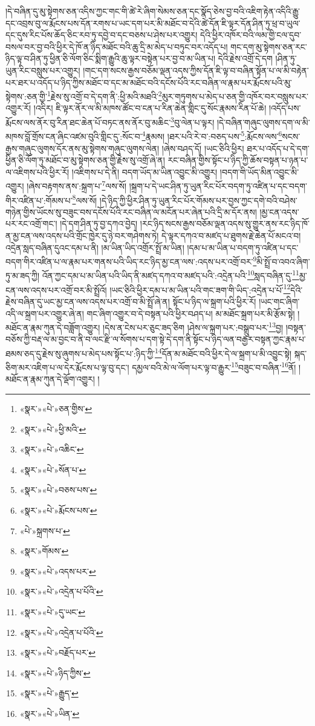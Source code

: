 །དེ་བཞིན་དུ་མུ་སྟེགས་ཅན་འདིས་ཀྱང་གང་གི་ཚེ་རེ་ཞིག་སེམས་ཅན་དང་སྣོད་ཅེས་བྱ་བའི་འཇིག་རྟེན་འདིའི་རྒྱུ་དང་འབྲས་བུ་ལ་རྨོངས་པས་དོན་རགས་པ་ཡང་དག་པར་མི་མཐོང་བ་དེའི་ཚེ་དོན་ཇི་ལྟར་དོན་ཤིན་ཏུ་ཕྲ་བ་ཡུལ་དང་དུས་རིང་པོས་ཆོད་ཅིང་རབ་ཏུ་དབྱེ་བ་དང་བཅས་པ་ཤེས་པར་འགྱུར། དེའི་ཕྱིར་འཁོར་བའི་ལམ་གྱི་ངལ་དུབ་བསལ་བར་བྱ་བའི་ཕྱིར་དེ་ཁོ་ན་ཉིད་མཐོང་བའི་ཆུ་དྲི་མ་མེད་པ་བཏུང་བར་འདོད་པ། གང་དག་མུ་སྟེགས་ཅན་རང་ཉིད་ལྟ་བ་ཤིན་ཏུ་ཕྱིན་ཅི་ལོག་ཅིང་སྨིག་རྒྱུའི་ཆུ་ལྟར་བསྟེན་པར་བྱ་བ་མ་ཡིན་པ། དེའི་རྗེས་འགྲོ་དེ་དག །ཤིན་ཏུ་ཡུན་རིང་བསླུས་པར་འགྱུར། །གང་དག་སངས་རྒྱས་བཅོམ་ལྡན་འདས་ཀྱིས་དོན་ཇི་ལྟ་བ་བཞིན་སྟོན་པ་ལ་མི་བརྟེན་པར་ཐར་པ་འདོད་པ་ཉིད་ཀྱིས་མཐོང་བ་དང་མ་མཐོང་བའི་དངོས་པོའི་རང་བཞིན་ལ་རྣམ་པར་རྨོངས་པའི་མུ་སྟེགས་:ཅན་གྱི་\footnote{«སྣར་»«པེ་»ཅན་གྱིས་}རྗེས་སུ་འགྲོ་བ་དེ་དག་ནི་:ཕྱི་མའི་མཐའི་\footnote{«སྣར་»«པེ་»ཕྱི་མའི་}མུར་གཏུགས་པ་མེད་པ་ཅན་གྱི་འཁོར་བར་བསླུས་པར་འགྱུར་རོ། །འདིར། ཇི་ལྟར་ནོར་ལ་མི་མཁས་ཚོང་བ་ངན་པ་རིན་ཆེན་གླིང་དུ་སོང་རྣམས་རིན་པོ་ཆེ། །འདོད་པས་རྨོངས་ལས་ནོར་བུ་རིན་ཐང་ཆེན་པོ་བཏང་ནས་ནོར་བུ་མཆིང་\footnote{«སྣར་»«པེ་»འཆིང་}བུ་ལེན་པ་ལྟར། །དེ་བཞིན་གཞུང་ལུགས་དག་ལ་མི་མཁས་བློ་གྲོས་ངན་ཞིང་འཛམ་བུའི་གླིང་དུ་:སོང་བ་\footnote{«སྣར་»«པེ་»སོན་པ་}རྣམས། །ཐར་པའི་རེ་བ་:བཅད་པས་\footnote{«སྣར་»«པེ་»བཅས་པས་}:རྨོངས་ལས་\footnote{«སྣར་»«པེ་»རྨོངས་པས་}སངས་རྒྱས་གཞུང་ལུགས་དོར་ནས་མུ་སྟེགས་གཞུང་ལུགས་ལེན། །ཞེས་བཤད་དོ། །ཡང་ཅིའི་ཕྱིར། ཐར་པ་འདོད་པ་དེ་དག་ཕྱིན་ཅི་ལོག་ཏུ་མཐོང་བ་མུ་སྟེགས་ཅན་གྱི་རྗེས་སུ་འགྲོ་ཞེ་ན། རང་བཞིན་གྱིས་སྟོང་པ་ཉིད་ཀྱི་ཆོས་བསྟན་པ་ཉན་པ་ལ་འཇིགས་པའི་ཕྱིར་རོ། །འཇིགས་པ་དེ་ནི། བདག་ཡོད་མ་ཡིན་འབྱུང་མི་འགྱུར། །བདག་གི་ཡོད་མིན་འབྱུང་མི་འགྱུར། །ཞེས་བརྟགས་ནས་:སྐྲག་པ་\footnote{«པེ་»སྐྲགས་པ་}ལས་སོ། །སྐྲག་པ་དེ་ཡང་ཤིན་ཏུ་ཡུན་རིང་པོར་བདག་ཏུ་འཛིན་པ་དང་བདག་གིར་འཛིན་པ་:གོམས་པ་\footnote{«སྣར་»གོམས་}ལས་སོ། །དེ་ཉིད་ཀྱི་ཕྱིར་ཤིན་ཏུ་ཡུན་རིང་པོར་གོམས་པར་བྱས་ཀྱང་དགེ་བའི་བཤེས་གཉེན་གྱིས་ཡོངས་སུ་བཟུང་བས་དངོས་པོའི་རང་བཞིན་ལ་མངོན་པར་ཞེན་པའི་དྲི་མ་དོར་ནས། །མྱ་ངན་འདས་པར་རང་འགྲོ་གང་། །དེ་དག་ཤིན་ཏུ་བྱ་དཀའ་བྱེད། །རང་ཉིད་སངས་རྒྱས་བཅོམ་ལྡན་འདས་སུ་གྱུར་ནས་རང་ཉིད་ཁོ་ན་མྱ་ངན་ལས་འདས་པའི་གྲོང་ཁྱེར་དུ་ཉེ་བར་གཤེགས་ཏེ། དེ་ལྟར་དཀའ་བ་མཛད་པ་ཐུགས་རྗེ་ཆེན་པོ་མངའ་བ། འདྲེན་སླད་བཞིན་དུའང་དམ་པ་ནི། །མ་ཡིན་ཡིད་འགྲོར་སྤྲོ་མ་ཡིན། །དམ་པ་མ་ཡིན་པ་བདག་ཏུ་འཛིན་པ་དང་བདག་གིར་འཛིན་པ་ལ་རྣམ་པར་གནས་པའི་ཡིད་རང་ཉིད་མྱ་ངན་ལས་:འདས་པར་འགྲོ་བར་\footnote{«སྣར་»«པེ་»འདས་པར་}མི་སྤྲོ་བ་འབའ་ཞིག་ཏུ་མ་ཟད་ཀྱི། འོན་ཀྱང་དམ་པ་མ་ཡིན་པའི་ཡིད་ནི་མཛད་དཀའ་བ་མཛད་པའི་:འདྲེན་པའི་\footnote{«སྣར་»«པེ་»འདྲེན་པ་པོའི་}སླད་བཞིན་དུ་\footnote{«སྣར་»«པེ་»དུ་ཡང་}མྱ་ངན་ལས་འདས་པར་འགྲོ་བར་མི་སྤྲོའོ། །ཡང་ཅིའི་ཕྱིར་དམ་པ་མ་ཡིན་པའི་གང་ཟག་གི་ཡིད་:འདྲེན་པ་པོ་\footnote{«སྣར་»«པེ་»འདྲེན་པ་པོའི་}དེའི་རྗེས་བཞིན་དུ་ཡང་མྱ་ངན་ལས་འདས་པར་འགྲོ་བ་མི་སྤྲོ་ཞེ་ན། སྟོང་པ་ཉིད་ལ་སྐྲག་པའི་ཕྱིར་རོ། །ཡང་གང་ཞིག་འདི་ལ་སྐྲག་པར་འགྱུར་ཞེ་ན། གང་ཞིག་འགྱུར་བ་དེ་བསྟན་པའི་ཕྱིར་བཤད་པ། མ་མཐོང་སྐྲག་པར་མི་རྩོམ་སྟེ། །མཐོང་ན་རྣམ་ཀུན་དེ་བཟློག་འགྱུར། །དེས་ན་ངེས་པར་ཅུང་ཟད་ཅིག །ཤེས་ལ་སྐྲག་པར་:བསྒྲུབ་པར་\footnote{«སྣར་»«པེ་»བརྗོད་པར་}བྱ། །བསྟན་བཅོས་ཀྱི་བརྡ་ལ་མ་བྱང་བ་ནི་བ་ལང་རྫི་ལ་སོགས་པ་དག་སྟེ་དེ་དག་ནི་སྟོང་པ་ཉིད་ལན་བརྒྱར་བསྟན་ཀྱང་རྣམ་པ་ཐམས་ཅད་དུ་རྗེས་སུ་ཞུགས་པ་མེད་པས་སྟོང་པ་:ཉིད་ཀྱི་\footnote{«སྣར་»«པེ་»ཉིད་ཀྱིས་}དོན་མ་མཐོང་བའི་ཕྱིར་དེ་ལ་སྐྲག་པ་མི་འབྱུང་སྟེ། སྐད་ཅིག་མར་འཇིག་པ་ལ་དེར་རྨོངས་པ་ལྟ་བུ་དང་། དམྱལ་བའི་མེ་ལ་ལོག་པར་ལྟ་བ་རྒྱུར་\footnote{«སྣར་»«པེ་»རྒྱུད་}བཟུང་བ་བཞིན་\footnote{«སྣར་»«པེ་»ཡིན་}ནོ། །མཐོང་ན་རྣམ་ཀུན་དེ་ལྡོག་འགྱུར། །
